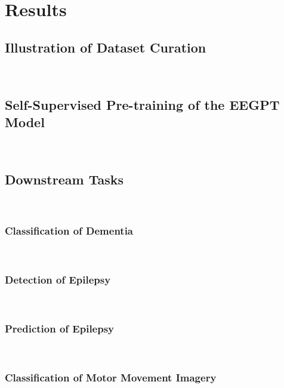 \section{Results}
\subsection{Illustration of Dataset Curation}
\\
\indent
\subsection{Self-Supervised Pre-training of the EEGPT Model}
\\
\indent
\subsection{Downstream Tasks}
\\
\indent
\subsubsection{Classification of Dementia}
\indent
\\
\subsubsection{Detection of Epilepsy}
\\
\indent
\subsubsection{Prediction of Epilepsy}
\\
\indent
\subsubsection{Classification of Motor Movement Imagery}
\\
\indent
\label{sec:results}